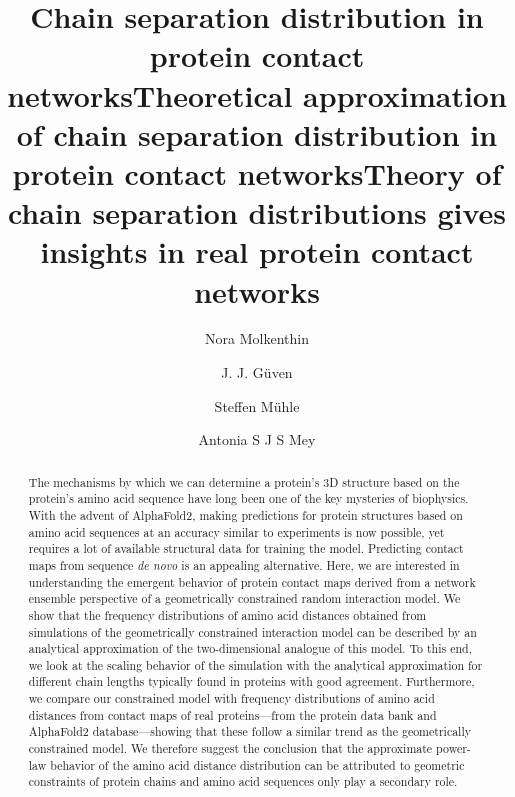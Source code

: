 \documentclass[
reprint,
twocolumn,
amsmath,amssymb,superscriptaddress,aps,
pre]{revtex4-1}
\begin{document}
\title{Chain separation distribution in protein contact networks}
\title{Theoretical approximation of chain separation distribution in protein contact networks}
\title{Theory of chain separation distributions gives insights in real protein contact networks}
\author{Nora Molkenthin}
\author{J. J.  Güven}
\author{Steffen Mühle}
\author{Antonia S J S Mey}

\begin{abstract}
The mechanisms by which we can determine a protein's 3D structure based on the protein's amino acid sequence have long been one of the key mysteries of biophysics. With the advent of AlphaFold2, making predictions for protein structures based on amino acid sequences at an accuracy similar to experiments is now possible, yet requires a lot of available structural data for training the model. Predicting contact maps from sequence \textit{de novo} is an appealing alternative. Here, we are interested in understanding the emergent behavior of protein contact maps derived from a network ensemble perspective of a geometrically constrained random interaction model. We show that the frequency distributions of amino acid distances obtained from simulations of the geometrically constrained interaction model can be described by an analytical approximation of the two-dimensional analogue of this model. To this end, we look at the scaling behavior of the simulation with the analytical approximation for different chain lengths typically found in proteins with good agreement. Furthermore, we compare our constrained model with frequency distributions of amino acid distances from contact maps of real proteins---from the protein data bank and AlphaFold2 database---showing that these follow a similar trend as the geometrically constrained model.   
 We therefore suggest the conclusion that the approximate power-law behavior of the amino acid distance distribution can be attributed to geometric constraints of protein chains and amino acid sequences only play a secondary role.  
\end{abstract}
\maketitle
\end{document}
